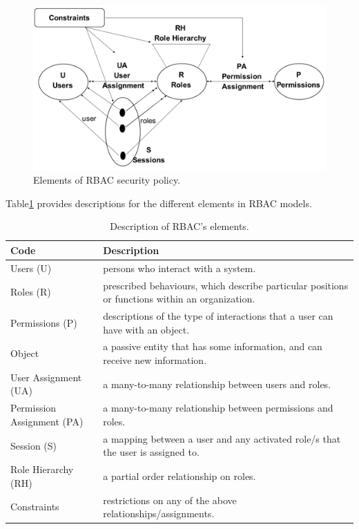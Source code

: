 \begin{figure}[bht]
\centering
\includegraphics[scale=0.25]{RBACelements.png}
\caption{Elements of RBAC security policy.}
\label{fig:elelmRBAC}
\end{figure}



Table\ref{tab:elements} provides descriptions for the different elements in RBAC models.

\begin{table}[bth]
\centering
\caption{Description of RBAC's elements.}
\small
{}
\begin{tabular}{p{1.6 in} p{5.2 in}} \hline 
\hline
Code & Description\\\hline

Users (U)&  persons who interact with a system.\\
Roles (R)& prescribed behaviours, which describe particular positions or functions within an organization. \\
Permissions (P)& descriptions of the type of interactions that a user can have with an object.\\
Object& a passive entity that has some information, and   can receive new information.\\
User Assignment (UA)&a many-to-many relationship between users and roles.\\
Permission Assignment (PA)& a many-to-many relationship between permissions and roles.\\
Session (S)& a mapping between a user and any activated role/s that the user is assigned to.\\
Role Hierarchy (RH)& a partial order relationship on roles.\\
Constraints&restrictions on any of the above relationships/assignments.  \\ \hline\hline

\end{tabular}
\label{tab:elements}


\end{table}


